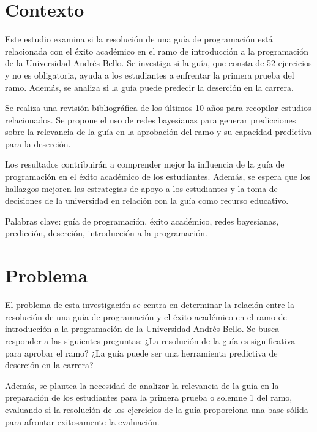 \tableofcontents

\hypertarget{contexto}{%
    \section{Contexto}\label{contexto}}

Este estudio examina si la resolución de una guía de programación está relacionada con el éxito
académico en el ramo de introducción a la programación de la Universidad Andrés Bello. Se investiga
si la guía, que consta de 52 ejercicios y no es obligatoria, ayuda a los estudiantes a enfrentar la
primera prueba del ramo. Además, se analiza si la guía puede predecir la deserción en la carrera.

Se realiza una revisión bibliográfica de los últimos 10 años para recopilar estudios relacionados.
Se propone el uso de redes bayesianas para generar predicciones sobre la relevancia de la guía
en la aprobación del ramo y su capacidad predictiva para la deserción.

Los resultados contribuirán a comprender mejor la influencia de la guía de programación
en el éxito académico de los estudiantes. Además, se espera que los hallazgos mejoren
las estrategias de apoyo a los estudiantes y la toma de decisiones de la universidad
en relación con la guía como recurso educativo.

Palabras clave: guía de programación, éxito académico, redes bayesianas, predicción, deserción, introducción a la programación.

\hypertarget{problema}{%
    \section{Problema}\label{problema}}

El problema de esta investigación se centra en determinar la relación entre
la resolución de una guía de programación y el éxito académico en el ramo
de introducción a la programación de la Universidad Andrés Bello. Se busca responder
a las siguientes preguntas: ¿La resolución de la guía es significativa para aprobar el ramo?
¿La guía puede ser una herramienta predictiva de deserción en la carrera?

Además, se plantea la necesidad de analizar la relevancia de la guía en la preparación de
los estudiantes para la primera prueba o solemne 1 del ramo, evaluando si la resolución de
los ejercicios de la guía proporciona una base sólida para afrontar exitosamente la evaluación.

